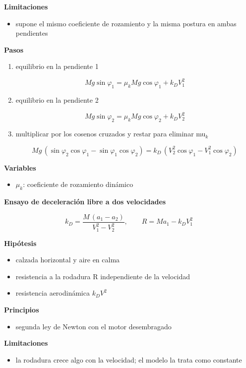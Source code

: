 \documentclass[10pt,openany]{book}
\begin{document}
\begin{tcolorbox}[title={Desarrollos del modelo}, studiumdef, breakable]
\noindent\textbf{Limitaciones}
\begin{itemize}
\item supone el mismo coeficiente de rozamiento y la misma postura en ambas pendientes
\end{itemize}

\noindent\textbf{Pasos}
\begin{enumerate}
\item
equilibrio en la pendiente 1

\[
Mg\sin\varphi_1 = \mu_k Mg\cos\varphi_1 + k_D V_1^{2}
\]
\item
equilibrio en la pendiente 2

\[
Mg\sin\varphi_2 = \mu_k Mg\cos\varphi_2 + k_D V_2^{2}
\]
\item
multiplicar por los cosenos cruzados y restar para eliminar mu\(_k\)

\[
Mg\,(\sin\varphi_2\cos\varphi_1 - \sin\varphi_1\cos\varphi_2) = k_D\,(V_2^{2}\cos\varphi_1 - V_1^{2}\cos\varphi_2)
\]
\end{enumerate}

\noindent\textbf{Variables}
\begin{itemize}
\item $\mu_k$: coeficiente de rozamiento dinámico
\end{itemize}



\noindent\textbf{Ensayo de deceleración libre a dos velocidades}

\begin{equation}
k_D = \frac{M\,(a_1 - a_2)}{V_1^{2} - V_2^{2}},\qquad R = M a_1 - k_D V_1^{2}
\label{eq:c07-deceleracion-libre}
\end{equation}

\noindent\textbf{Hipótesis}
\begin{itemize}
\item calzada horizontal y aire en calma
\item resistencia a la rodadura R independiente de la velocidad
\item resistencia aerodinámica \(k_D V^2\)
\end{itemize}

\noindent\textbf{Principios}
\begin{itemize}
\item segunda ley de Newton con el motor desembragado
\end{itemize}

\noindent\textbf{Limitaciones}
\begin{itemize}
\item la rodadura crece algo con la velocidad; el modelo la trata como constante
\end{itemize}


\end{tcolorbox}
\end{document}
